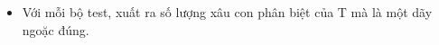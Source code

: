 \begin{itemize}
	\item     Với mỗi bộ test, xuất ra số lượng xâu con phân biệt của T mà là một dãy ngoặc đúng.   
\end{itemize}